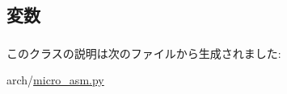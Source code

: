 \subsection{変数}
\hypertarget{classmicro__asm_1_1Label_a805ea2c810958885998ce5aed1266138}{
\subsubsection[{extern}]{}}
\label{classmicro__asm_1_1Label_a805ea2c810958885998ce5aed1266138}
\hypertarget{classmicro__asm_1_1Label_ab74e6bf80237ddc4109968cedc58c151}{
\subsubsection[{name}]{}}
\label{classmicro__asm_1_1Label_ab74e6bf80237ddc4109968cedc58c151}


このクラスの説明は次のファイルから生成されました:\begin{DoxyCompactItemize}
\item 
arch/\hyperlink{micro__asm_8py}{micro\_\-asm.py}\end{DoxyCompactItemize}
